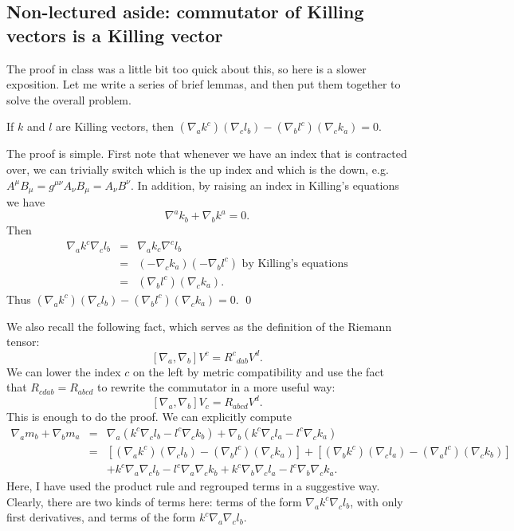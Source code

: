 \subsection*{Non-lectured aside: commutator of Killing vectors is a Killing vector} The proof in class was a little bit too quick about this, so here is a slower exposition. Let me write a series of brief lemmas, and then put them together to solve the overall problem.

\begin{lem}\label{killinglemma}
If $k$ and $l$ are Killing vectors, then $(\nabla_a k^c)(\nabla_c l_b)-(\nabla_b l^c )(\nabla_c k_a)=0$.
\end{lem}
The proof is simple. First note that whenever we have an index that is contracted over, we can trivially switch which is the up index and which is the down, e.g. $A^\mu B_\mu=g^{\mu\nu} A_\nu B_\mu= A_\nu B^\nu$. In addition, by raising an index in Killing's equations we have
$$\nabla^a k_b + \nabla_b k^a = 0.$$
Then
\begin{eqnarray*}
\nabla_a k^c \nabla_c l_b &=& \nabla_a k_c \nabla^c l_b\\
&=&(-\nabla_c k_a)(-\nabla_b l^c)\text{ by Killing's equations}\\
&=&(\nabla_b l^c)(\nabla_c k_a). 
\end{eqnarray*}
Thus $(\nabla_a k^c)(\nabla_c l_b)-(\nabla_b l^c )(\nabla_c k_a)=0$. \qed

We also recall the following fact, which serves as the definition of the Riemann tensor:
$$[\nabla_a,\nabla_b]V^c={R^c}_{dab}V^d.$$
We can lower the index $c$ on the left by metric compatibility and use the fact that $R_{cdab}=R_{abcd}$ to rewrite the commutator in a more useful way:
\begin{equation}\label{riemannascommutator}
[\nabla_a,\nabla_b]V_c=R_{abcd}V^d.
\end{equation}
%
This is enough to do the proof. We can explicitly compute
\begin{eqnarray*}
\nabla_a m_b +\nabla_b m_a &=& \nabla_a (k^c \nabla_c l_b - l^c \nabla_c k_b)+\nabla_b (k^c \nabla_c l_a -l^c \nabla_c k_a)\\
&=& \left[(\nabla_a k^c)( \nabla_c l_b) -(\nabla_b l^c)( \nabla_c k_a)\right]+ \left[(\nabla_b k^c)( \nabla_c l_a)-(\nabla_a l^c )(\nabla_c k_b)\right]  \\
&&+k^c \nabla_a \nabla_c l_b - l^c \nabla_a \nabla_c k_b +k^c \nabla_b \nabla_c l_a - l^c \nabla_b \nabla_c k_a.
\end{eqnarray*}
Here, I have used the product rule and regrouped terms in a suggestive way. Clearly, there are two kinds of terms here: terms of the form $\nabla_a k^c \nabla_c l_b$, with only first derivatives, and terms of the form $k^c \nabla_a \nabla_c l_b.$

